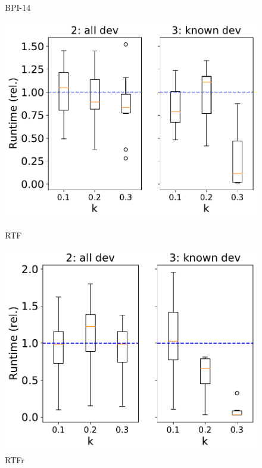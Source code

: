 \documentclass[landscape]{article}
\begin{document}
\begin{figure}[!htb]
\begin{minipage}{0.22\textwidth}
		\caption{BPI-14}
	\end{minipage}
	\hfill
	\begin{minipage}{0.22\textwidth}
		\includegraphics[width=1.0\textwidth]{../Road_Traffic_Fines_Management_Process/Road_Traffic_Fines_Management_Process_approximation_comparison_time.pdf}
		\caption{RTF}
	\end{minipage}
	\hfill
	\begin{minipage}{0.22\textwidth}
	\includegraphics[width=1.0\textwidth]{../RTFM_model2/RTFM_model2_approximation_comparison_time.pdf}
		\caption{RTFr}
	\end{minipage}
\end{figure}
\end{document}
